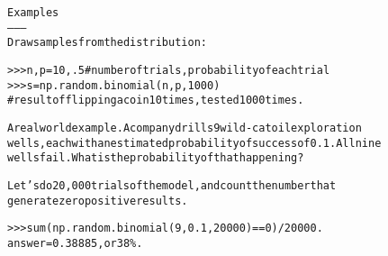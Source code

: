 \begin{boxedminipage}{\funcwidth}
\begin{alltt}
Examples
--------
Draw samples from the distribution:

{\textgreater}{\textgreater}{\textgreater} n, p = 10, .5 \# number of trials, probability of each trial
{\textgreater}{\textgreater}{\textgreater} s = np.random.binomial(n, p, 1000)
\# result of flipping a coin 10 times, tested 1000 times.

A real world example. A company drills 9 wild-cat oil exploration
wells, each with an estimated probability of success of 0.1. All nine
wells fail. What is the probability of that happening?

Let's do 20,000 trials of the model, and count the number that
generate zero positive results.

{\textgreater}{\textgreater}{\textgreater} sum(np.random.binomial(9,0.1,20000)==0)/20000.
answer = 0.38885, or 38\%.
\end{alltt}

\setlength{\parskip}{1ex}
    \end{boxedminipage}

    \label{QSTK:qstklearn:mldiagnostics:chisquare}

    \vspace{0.5ex}

